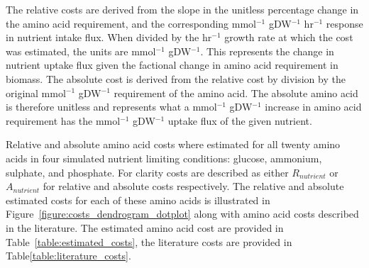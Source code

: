 The relative costs are derived from the slope in the unitless percentage change in the amino acid requirement, and the corresponding mmol$^{-1}$ gDW$^{-1}$ hr$^{-1}$ response in nutrient intake flux. When divided by the hr$^{-1}$ growth rate at which the cost was estimated, the units are mmol$^{-1}$ gDW$^{-1}$. This represents the change in nutrient uptake flux given the factional change in amino acid requirement in biomass. The absolute cost is derived from the relative cost by division by the original mmol$^{-1}$ gDW$^{-1}$ requirement of the amino acid. The absolute amino acid is therefore unitless and represents what a mmol$^{-1}$ gDW$^{-1}$ increase in amino acid requirement has the mmol$^{-1}$ gDW$^{-1}$ uptake flux of the given nutrient.

Relative and absolute amino acid costs where estimated for all twenty amino acids in four simulated nutrient limiting conditions: glucose, ammonium, sulphate, and phosphate. For clarity costs are described as either $R_{nutrient}$ or $A_{nutrient}$ for relative and absolute costs respectively. The relative and absolute estimated costs for each of these amino acids is illustrated in Figure~\vref{figure:costs_dendrogram_dotplot} along with amino acid costs described in the literature. The estimated amino acid cost are provided in Table~\vref{table:estimated_costs}, the literature costs are provided in Table\vref{table:literature_costs}.

